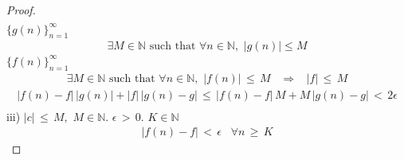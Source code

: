 \begin{theorem}
\begin{proof}
\begin{align*}
    \end{align*}
     $\{g(n)\}_{n = 1}^{\infty}$ 
    \begin{align*}
        \exists M \in \mathbb{N} \text{ such that } \forall n \in \mathbb{N}, \hspace{4pt} \lvert g(n) \rvert \leq M 
    \end{align*}
     $\{f(n)\}_{n = 1}^{\infty}$ 
    \begin{align*}
        \exists M \in \mathbb{N} \text{ such that } \forall n \in \mathbb{N}, \hspace{4pt} \lvert f(n) \rvert \hspace{2pt} \leq \hspace{2pt} M \hspace{10pt} \Longrightarrow \hspace{10pt} \lvert f \rvert \hspace{2pt} \leq \hspace{2pt} M  
    \end{align*}
    \begin{align*}
        \lvert f(n) - f \rvert \hspace{2pt} \lvert g(n) \rvert + \lvert f \rvert \hspace{2pt} \lvert g(n) - g \rvert \hspace{2pt} \leq \hspace{2pt} \lvert f(n) - f \rvert \hspace{2pt} M + M \hspace{2pt} \lvert g(n) - g \rvert \hspace{2pt} < \hspace{2pt} 2\epsilon \\[4ex]
    \end{align*}
    iii)  $\lvert c \rvert \hspace{2pt} \leq \hspace{2pt} M,$  $M \in \mathbb{N}$.  $\epsilon \hspace{2pt} > \hspace{2pt} 0$.  $K \in \mathbb{N}$ 
    \begin{align*}
        \lvert f(n) - f \rvert \hspace{2pt} < \hspace{2pt} \epsilon \hspace{10pt} \forall n \hspace{2pt} \geq \hspace{2pt} K 

\end{align*}
\end{proof}
\end{theorem}
